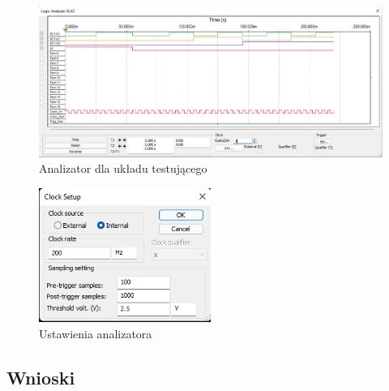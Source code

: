 \documentclass{article}
\begin{document}
\begin{figure}[H]
    \centering
    \includegraphics[width=\textwidth]{3a_modulo8_ana.png}
    \caption{Analizator dla układu testującego}
\end{figure}

\begin{figure}[H]
    \centering
    \includegraphics[width=0.5\textwidth]{3a_modulo8_anasetup.png}
    \caption{Ustawienia analizatora}
\end{figure}

\subsection{Wnioski}
\end{document}
